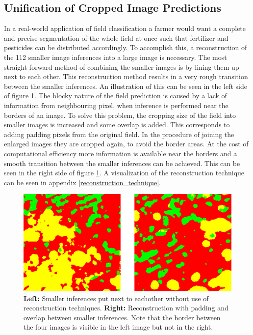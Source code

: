 \documentclass{article}
\begin{document}
\subsection{Unification of Cropped Image Predictions}
In a real-world application of field classification a farmer would want a complete and precise segmentation of the whole field at once such that fertilizer and pesticides can be distributed accordingly.
To accomplish this, a reconstruction of the 112 smaller image inferences into a large image is necessary.
The most straight forward method of combining the smaller images is by lining them up next to each other.
This reconstruction method results in a very rough transition between the smaller inferences. An illustration of this can be seen in the left side of figure \ref{fig:earlylatereconstruction}.
The blocky nature of the field prediction is caused by a lack of information from neighbouring pixel, when inference is performed near the borders of an image. 
To solve this problem, the cropping size of the field into smaller images is increased and some overlap is added. This corresponds to adding padding pixels from the original field.
In the procedure of joining the enlarged images they are cropped again, to avoid the border areas. At the cost of computational efficiency more information is available near the borders and a smooth transition between the smaller inferences can be achieved. This can be seen in the right side of figure \ref{fig:earlylatereconstruction}. A visualization of the reconstruction technique can be seen in appendix \ref{reconstruction_technique}.
\begin{figure}[!htb]
	\centering
	\includegraphics[width=0.9\linewidth]{early_late_reconstruction2}
	\caption{\textbf{Left:} Smaller inferences put next to eachother without use of reconstruction techniques. \textbf{Right:} Reconstruction with padding and overlap between smaller inferences. Note that the border between the four images is visible in the left image but not in the right.}
	\label{fig:earlylatereconstruction}
\end{figure}
\end{document}
